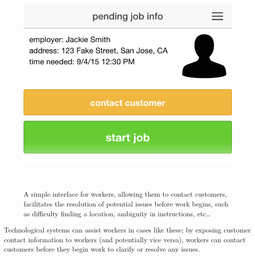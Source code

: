 \begin{figure}[t]
\centering
  \includegraphics[width=1\columnwidth]{figures/startwork}
    \caption{A simple interface for workers,
    allowing them to contact customers,
    facilitates the resolution of potential issues before work begins,
    such as difficulty finding a location, ambiguity in instructions, etc\dots}~\label{fig:startwork}
\end{figure}

Technological systems can assist workers in cases like these;
by exposing customer contact information to workers (and potentially vice versa),
workers can contact customers before they begin work to clarify or resolve any issues.
